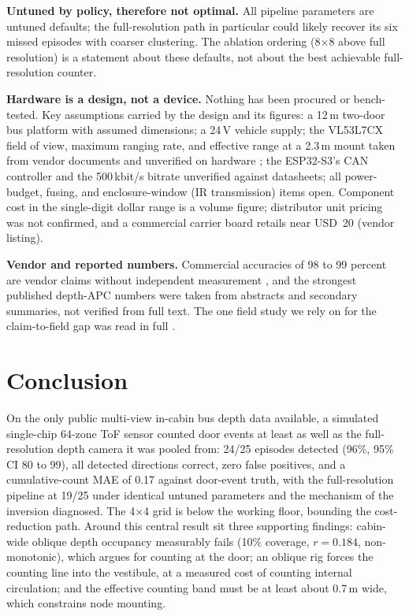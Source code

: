 \documentclass[conference]{IEEEtran}
\begin{document}
\textbf{Untuned by policy, therefore not optimal.} All pipeline parameters are
untuned defaults; the full-resolution path in particular could likely recover
its six missed episodes with coarser clustering. The ablation ordering
(8$\times$8 above full resolution) is a statement about these defaults, not
about the best achievable full-resolution counter.

\textbf{Hardware is a design, not a device.} Nothing has been procured or
bench-tested. Key assumptions carried by the design and its figures: a 12\,m
two-door bus platform with assumed dimensions; a 24\,V vehicle supply; the
VL53L7CX field of view, maximum ranging rate, and effective range at a 2.3\,m
mount taken from vendor documents and unverified on hardware
\cite{st_vl53l7cx}; the ESP32-S3's CAN controller and the 500\,kbit/s bitrate
unverified against datasheets; all power-budget, fusing, and enclosure-window
(IR transmission) items open. Component cost in the single-digit dollar range
is a volume figure; distributor unit pricing was not confirmed, and a
commercial carrier board retails near USD~20 (vendor listing).

\textbf{Vendor and reported numbers.} Commercial accuracies of 98 to 99
percent are vendor claims without independent measurement \cite{irma,dilax},
and the strongest published depth-APC numbers \cite{seidel2021,seo2026,lu2021,%
jeong2025} were taken from abstracts and secondary summaries, not verified
from full text. The one field study we rely on for the claim-to-field gap was
read in full \cite{pronello2023}.

\section{Conclusion}
\label{sec:conclusion}

On the only public multi-view in-cabin bus depth data available, a simulated
single-chip 64-zone ToF sensor counted door events at least as well as the
full-resolution depth camera it was pooled from: 24/25 episodes detected
(96\%, 95\% CI 80 to 99), all detected directions correct, zero false
positives, and a cumulative-count MAE of 0.17 against door-event truth, with
the full-resolution pipeline at 19/25 under identical untuned parameters and
the mechanism of the inversion diagnosed. The 4$\times$4 grid is below the
working floor, bounding the cost-reduction path. Around this central result
sit three supporting findings: cabin-wide oblique depth occupancy measurably
fails (10\% coverage, $r=0.184$, non-monotonic), which argues for counting at
the door; an oblique rig forces the counting line into the vestibule, at a
measured cost of counting internal circulation; and the effective counting
band must be at least about 0.7\,m wide, which constrains node mounting.
\end{document}
